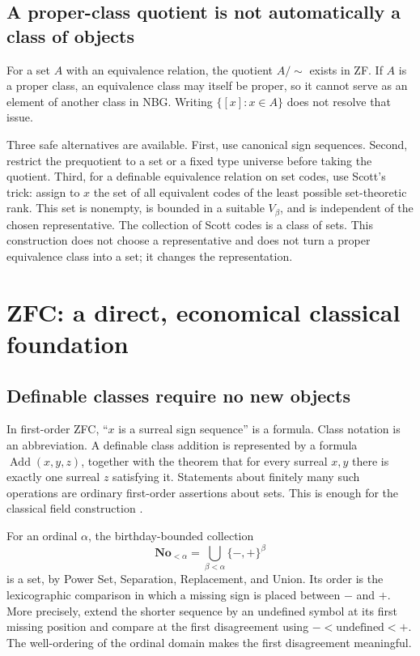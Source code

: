 \documentclass[11pt,letterpaper]{article}
\theoremstyle{definition}
\theoremstyle{remark}
\newcommand{\No}{\mathbf{No}}
\numberwithin{equation}{section}
\begin{document}
\subsection{A proper-class quotient is not automatically a class of objects}
For a set \(A\) with an equivalence relation, the quotient \(A/{\sim}\) exists in ZF. If \(A\) is a proper class, an equivalence class may itself be proper, so it cannot serve as an element of another class in NBG. Writing \(\{[x]:x\in A\}\) does not resolve that issue.

Three safe alternatives are available. First, use canonical sign sequences. Second, restrict the prequotient to a set or a fixed type universe before taking the quotient. Third, for a definable equivalence relation on set codes, use Scott's trick: assign to \(x\) the set of all equivalent codes of the least possible set-theoretic rank. This set is nonempty, is bounded in a suitable \(V_\beta\), and is independent of the chosen representative. The collection of Scott codes is a class of sets. This construction does not choose a representative and does not turn a proper equivalence class into a set; it changes the representation.

\section{ZFC: a direct, economical classical foundation}\label{sec:zfc}

\subsection{Definable classes require no new objects}
In first-order ZFC, ``\(x\) is a surreal sign sequence'' is a formula. Class notation is an abbreviation. A definable class addition is represented by a formula \(\operatorname{Add}(x,y,z)\), together with the theorem that for every surreal \(x,y\) there is exactly one surreal \(z\) satisfying it. Statements about finitely many such operations are ordinary first-order assertions about sets. This is enough for the classical field construction \cite{Conway,Gonshor}.

For an ordinal \(\alpha\), the birthday-bounded collection
\[
 \No_{<\alpha}=\bigcup_{\beta<\alpha}\{-,+\}^{\beta}
\]
is a set, by Power Set, Separation, Replacement, and Union. Its order is the lexicographic comparison in which a missing sign is placed between \(-\) and \(+\). More precisely, extend the shorter sequence by an undefined symbol at its first missing position and compare at the first disagreement using \(-<\text{undefined}<+\). The well-ordering of the ordinal domain makes the first disagreement meaningful.
\end{document}
